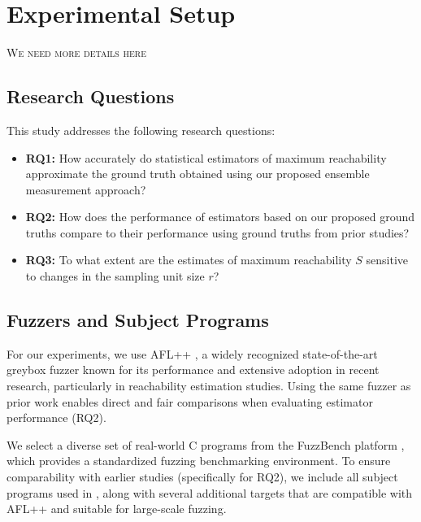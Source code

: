 \documentclass[conference]{IEEEtran}
\begin{document}


\section{Experimental Setup} \label{sec:setup}
\textsc{We need more details here}

\subsection{Research Questions}

This study addresses the following research questions:

\begin{itemize}
    \item \textbf{RQ1:} How accurately do statistical estimators of maximum reachability approximate the ground truth obtained using our proposed ensemble measurement approach?
    
    \item \textbf{RQ2:} How does the performance of estimators based on our proposed ground truths compare to their performance using ground truths from prior studies?
    
    \item \textbf{RQ3:} To what extent are the estimates of maximum reachability $S$ sensitive to changes in the sampling unit size $r$?
\end{itemize}

\subsection{Fuzzers and Subject Programs}

For our experiments, we use AFL++ \cite{fioraldi2020AFL++}, a widely recognized state-of-the-art greybox fuzzer known for its performance and extensive adoption in recent research, particularly in reachability estimation studies. Using the same fuzzer as prior work enables direct and fair comparisons when evaluating estimator performance (RQ2).

We select a diverse set of real-world C programs from the FuzzBench platform \cite{metzman2021fuzzbench}, which provides a standardized fuzzing benchmarking environment. To ensure comparability with earlier studies (specifically for RQ2), we include all subject programs used in \cite{liyanage2023reachable}, along with several additional targets that are compatible with AFL++ and suitable for large-scale fuzzing.
\end{document}
